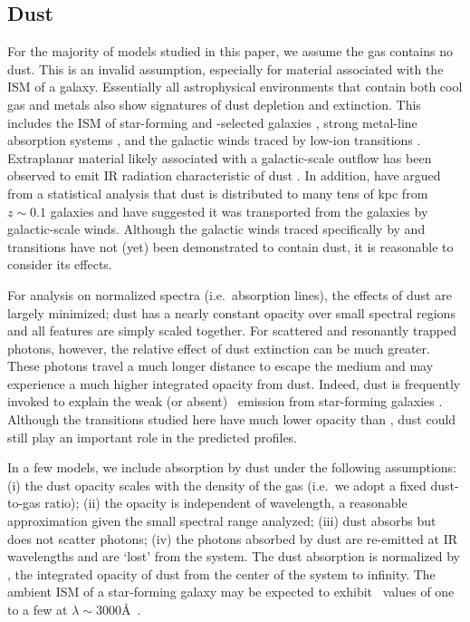 \documentclass[]{emulateapj}
\begin{document}
\subsection{Dust}
\label{sec:dust_method}

For the majority of models studied in this paper, we assume the gas
contains no dust.
This is an invalid assumption, especially for material associated with
the ISM of a galaxy.  
Essentially all astrophysical environments that contain both cool gas
and metals also show signatures of dust depletion and extinction.  This includes the
ISM of star-forming and -selected galaxies
\citep[e.g.][]{ss96,pw01,pcd+07}, strong  metal-line
absorption systems \citep{ykv+06,mnt+08}, and the galactic winds traced
by low-ion transitions \citep{prs+02,rvs05b}.  
Extraplanar material likely associated with a galactic-scale 
outflow has been observed to emit IR radiation characteristic of dust 
\citep[e.g.][]{hrg90,adb99,rkl01}.
In addition, \cite{msf+10} have argued from a statistical analysis
that dust is distributed to many tens of kpc from $z \sim 0.1$ galaxies
and have suggested it was transported from the galaxies by
galactic-scale winds.  
Although the galactic winds
traced specifically by  and  transitions have not (yet) been
demonstrated to contain dust, it is reasonable to consider its effects.

For analysis on normalized spectra (i.e.\ absorption lines), the effects of dust are largely minimized; 
dust has a nearly constant opacity over small spectral regions and all
features are simply scaled together.
For scattered and resonantly trapped photons, however, the relative effect of dust
extinction can be much greater.  
These photons travel a much longer distance to escape the medium and
may experience a much higher integrated opacity from dust.
Indeed, dust is frequently invoked to
explain the weak (or absent) \lya\ emission from star-forming galaxies
\citep[e.g.][]{shapley03}.  Although the transitions studied here have
much lower opacity than \lya, dust could still play an important role
in the predicted profiles.

In a few models, we include absorption by dust under the following
assumptions:
(i) the dust opacity scales with the density of the gas (i.e.\ we
adopt a fixed dust-to-gas ratio);
(ii) the opacity is independent of wavelength, a reasonable
approximation given the small spectral range analyzed;
(iii) dust absorbs but does not scatter photons;
(iv) the photons absorbed by dust are re-emitted at IR wavelengths
and are `lost' from the system.  The dust absorption is normalized by \taud, 
the integrated opacity of dust from the center of the system to
infinity.  The ambient ISM of a star-forming galaxy may be expected to exhibit
\taud\ values of one to a few at $\lambda \sim 3000$\AA\ \citep[e.g.][]{cf00}.
\end{document}
